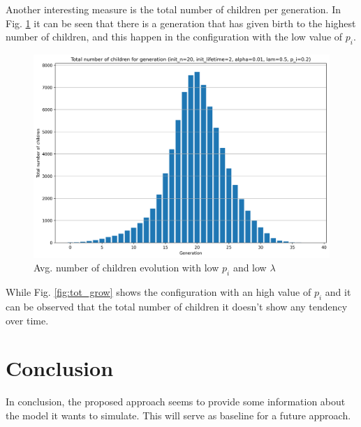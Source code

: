 \documentclass[conference]{IEEEtran}
\begin{document}
        Another interesting measure is the total number of children per generation.
        In Fig. \ref{fig:tot_low} it can be seen that there is a generation that has given birth to the highest number of children, and this happen in the configuration with the low value of $p_i$.

        \begin{figure}[!ht]
            \centering
            \includegraphics[width=\columnwidth]{media/in_p_20_in_lt_2_a_0.01_l_0.5_p_i_0.2/tot.png}
            \caption[short]{Avg. number of children evolution with low $p_i$ and low $\lambda$}
            \label{fig:tot_low}
        \end{figure}

        While Fig. \ref{fig:tot_grow} shows the configuration with an high value of $p_i$ and it can be observed that the total number of children it doesn't show any tendency over time. 
    
\section{Conclusion}

In conclusion, the proposed approach seems to provide some information about the model it wants to simulate. This will serve as baseline for a future approach.

%
%
\end{document}
